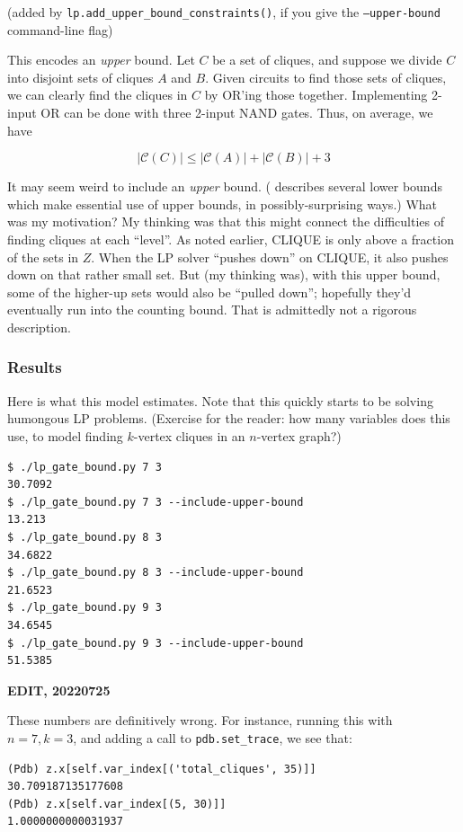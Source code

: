 \documentclass[12pt]{article}
\theoremstyle{definition}
\newcommand{\bigC}[0]{\mathcal{C}}
\begin{document}
(added by {\tt lp.add\_upper\_bound\_constraints()}, if you give
the {\tt --upper-bound} command-line flag)

This encodes an {\em upper} bound.
Let $C$ be a set of cliques, and suppose we divide $C$ into
disjoint sets of cliques $A$ and $B$. Given circuits to
find those sets of cliques, we can clearly find the cliques
in $C$ by OR'ing those together. Implementing 2-input OR can be
done with three 2-input NAND gates. Thus, on average, we have

\[
|\bigC(C)| \le |\bigC(A)| + |\bigC(B)| + 3
\]

It may seem weird to include an {\em upper} bound.
(\cite{aaronson_pnp} describes several lower bounds which make
essential use of upper bounds, in possibly-surprising ways.)
 What was
my motivation? My thinking was that this might connect the difficulties
of finding cliques at each ``level''. As noted earlier, CLIQUE
is only above a fraction of the sets in $Z$. When the LP solver
``pushes down'' on CLIQUE, it also pushes down on that rather small
set. But (my thinking was), with this upper bound, some of the
higher-up sets would also be ``pulled down''; hopefully they'd
eventually run into the counting bound. That is admittedly
not a rigorous description.

\subsubsection{Results}

Here is what this model estimates. Note that this quickly starts
to be solving humongous LP problems. (Exercise for the reader:
how many variables does this use, to model finding $k$-vertex
cliques in an $n$-vertex graph?)

\begin{verbatim}
$ ./lp_gate_bound.py 7 3
30.7092
$ ./lp_gate_bound.py 7 3 --include-upper-bound
13.213
$ ./lp_gate_bound.py 8 3
34.6822
$ ./lp_gate_bound.py 8 3 --include-upper-bound
21.6523
$ ./lp_gate_bound.py 9 3
34.6545
$ ./lp_gate_bound.py 9 3 --include-upper-bound
51.5385
\end{verbatim}

{\bf EDIT, 20220725}

These numbers are definitively wrong. For instance, running
this with $n=7, k=3$, and adding a call to {\tt pdb.set\_trace},
we see that:

\begin{verbatim}
(Pdb) z.x[self.var_index[('total_cliques', 35)]]
30.709187135177608
(Pdb) z.x[self.var_index[(5, 30)]]
1.0000000000031937
\end{verbatim}
\end{document}
